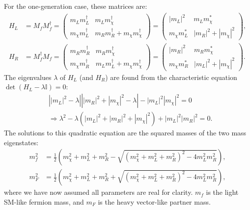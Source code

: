 For the one-generation case, these matrices are:
\begin{align*}
H_L &= M_f M_f^\dagger = \begin{pmatrix}
m_L m_L^\dagger & m_L m_{\chi}^\dagger \\
m_{\chi} m_L^\dagger & m_R m_R^\dagger + m_{\chi} m_{\chi}^\dagger
\end{pmatrix} = \begin{pmatrix}
|m_L|^2 & m_L m_{\chi}^* \\
m_{\chi} m_L^* & |m_R|^2 + |m_{\chi}|^2
\end{pmatrix}, \\
H_R &= M_f^\dagger M_f = \begin{pmatrix}
m_R m_R^\dagger & m_R m_{\chi}^\dagger \\
m_{\chi} m_R^\dagger & m_L m_L^\dagger + m_{\chi} m_{\chi}^\dagger
\end{pmatrix} = \begin{pmatrix}
|m_R|^2 & m_R m_{\chi}^* \\
m_{\chi} m_R^* & |m_L|^2 + |m_{\chi}|^2
\end{pmatrix}.
\end{align*}
The eigenvalues $\lambda$ of $H_L$ (and $H_R$) are found from the characteristic equation $\det(H_L - \lambda \mathbb{I}) = 0$:
\begin{align*}
&\left||m_L|^2 - \lambda \right| \left| |m_R|^2 + |m_{\chi}|^2 - \lambda \right| - |m_L|^2 |m_{\chi}|^2 = 0 \\
&\Rightarrow \lambda^2 - \lambda (|m_L|^2 + |m_R|^2 + |m_{\chi}|^2) + |m_L|^2 |m_R|^2 = 0.
\end{align*}
The solutions to this quadratic equation are the squared masses of the two mass eigenstates:
\begin{align}
m_f^2 &= \frac{1}{2} \left( m_{\chi}^2 + m_L^2 + m_R^2 - \sqrt{ (m_{\chi}^2 + m_L^2 + m_R^2)^2 - 4 m_L^2 m_R^2 } \right), \label{eq:m_f_detail} \\
m_F^2 &= \frac{1}{2} \left( m_{\chi}^2 + m_L^2 + m_R^2 + \sqrt{ (m_{\chi}^2 + m_L^2 + m_R^2)^2 - 4 m_L^2 m_R^2 } \right), \label{eq:m_F_detail}
\end{align}
where we have now assumed all parameters are real for clarity. $m_f$ is the light SM-like fermion mass, and $m_F$ is the heavy vector-like partner mass.

